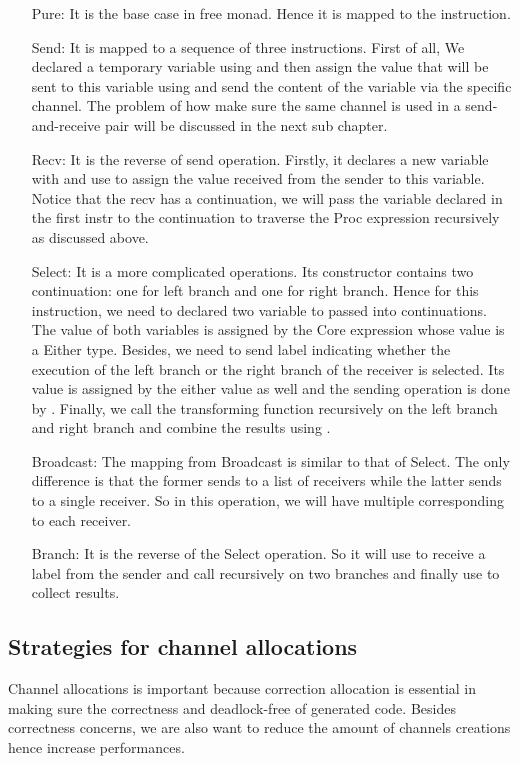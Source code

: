 \begin{itemize}
    \item[Pure:] It is the base case in free monad. Hence it is mapped to the  instruction.
    \item[Send:] It is mapped to a sequence of three instructions. First of all, We declared a temporary variable using  and then assign the value that will be sent to this variable using  and send the content of the variable via the specific channel. The problem of how make sure the same channel is used in a send-and-receive pair will be discussed in the next sub chapter.
    \item[Recv:] It is the reverse of send operation. Firstly, it declares a new variable with  and use  to assign the value received from the sender to this variable. Notice that the recv has a continuation, we will pass the variable declared in the first instr to the continuation to traverse the Proc expression recursively as discussed above. 
    \item[Select:] It is a more complicated operations. Its constructor contains two continuation: one for left branch and one for right branch. Hence for this instruction, we need to declared two variable to passed into continuations. The value of both variables is assigned by the Core expression whose value is a Either type. Besides, we need to send label indicating whether the execution of the left branch or the right branch of the receiver is selected. Its value is assigned by the either value as well and the sending operation is done by . Finally, we call the transforming function recursively on the left branch and right branch and combine the results using .
    \item[Broadcast:] The mapping from Broadcast is similar to that of Select. The only difference is that the former sends to a list of receivers while the latter sends to a single receiver. So in this operation, we will have multiple  corresponding to each receiver.  
    \item[Branch:] It is the reverse of the Select operation. So it will use  to receive a label from the sender and call recursively on two branches and finally use  to collect results.
\end{itemize}
\subsection{Strategies for channel allocations}
Channel allocations is important because correction allocation is essential in making sure the correctness and deadlock-free of generated code. Besides correctness concerns, we are also want to reduce the amount of channels creations hence increase performances. 

